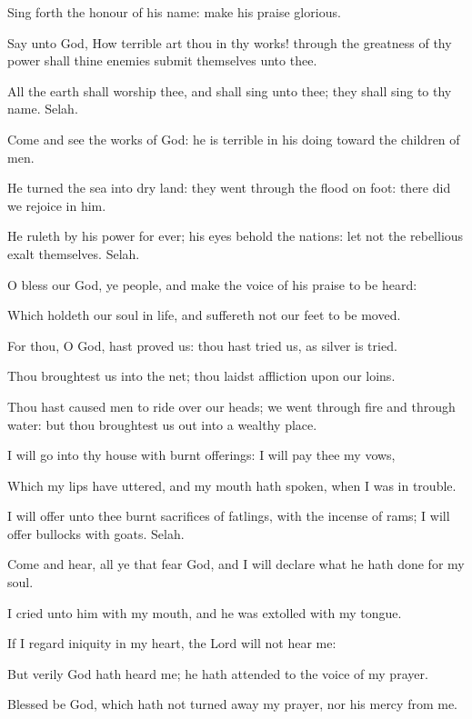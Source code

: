 \verse Sing forth the honour of his name: make his praise glorious.

\verse Say unto God, How terrible art thou in thy works! through the greatness of thy power shall thine enemies submit themselves unto thee.

\verse All the earth shall worship thee, and shall sing unto thee; they shall sing to thy name. Selah.

\verse Come and see the works of God: he is terrible in his doing toward the children of men.

\verse He turned the sea into dry land: they went through the flood on foot: there did we rejoice in him.

\verse He ruleth by his power for ever; his eyes behold the nations: let not the rebellious exalt themselves. Selah.

\verse O bless our God, ye people, and make the voice of his praise to be heard:

\verse Which holdeth our soul in life, and suffereth not our feet to be moved.

\verse For thou, O God, hast proved us: thou hast tried us, as silver is tried.

\verse Thou broughtest us into the net; thou laidst affliction upon our loins.

\verse Thou hast caused men to ride over our heads; we went through fire and through water: but thou broughtest us out into a wealthy place.

\verse I will go into thy house with burnt offerings: I will pay thee my vows,

\verse Which my lips have uttered, and my mouth hath spoken, when I was in trouble.

\verse I will offer unto thee burnt sacrifices of fatlings, with the incense of rams; I will offer bullocks with goats. Selah.

\verse Come and hear, all ye that fear God, and I will declare what he hath done for my soul.

\verse I cried unto him with my mouth, and he was extolled with my tongue.

\verse If I regard iniquity in my heart, the Lord will not hear me:

\verse But verily God hath heard me; he hath attended to the voice of my prayer.

\verse Blessed be God, which hath not turned away my prayer, nor his mercy from me.





